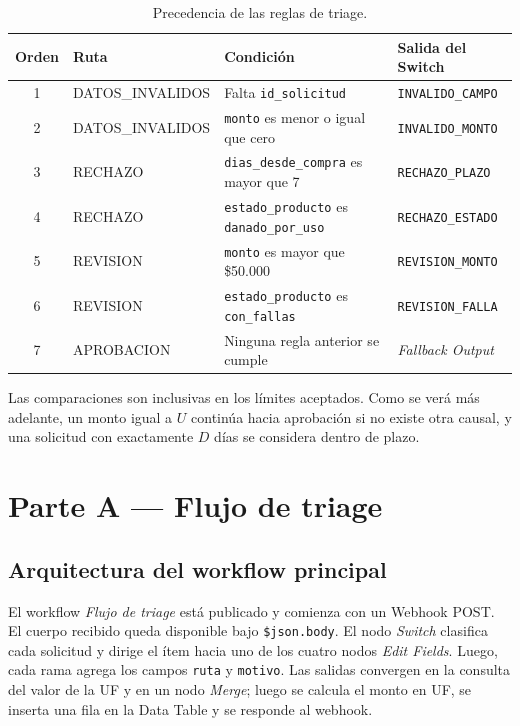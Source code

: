 \documentclass[11pt,letterpaper]{article}
\begin{document}
\begin{table}[H]
\centering
\caption{Precedencia de las reglas de triage.}
\small
\begin{tabularx}{\textwidth}{c l >{\RaggedRight\arraybackslash}X l}
\toprule
\textbf{Orden} & \textbf{Ruta} & \textbf{Condición} & \textbf{Salida del Switch} \\
\midrule
1 & DATOS\_INVALIDOS & Falta \texttt{id\_solicitud} & \texttt{INVALIDO\_CAMPO} \\
2 & DATOS\_INVALIDOS & \texttt{monto} es menor o igual que cero & \texttt{INVALIDO\_MONTO} \\
3 & RECHAZO & \texttt{dias\_desde\_compra} es mayor que 7 & \texttt{RECHAZO\_PLAZO} \\
4 & RECHAZO & \texttt{estado\_producto} es \texttt{danado\_por\_uso} & \texttt{RECHAZO\_ESTADO} \\
5 & REVISION & \texttt{monto} es mayor que \$50.000 & \texttt{REVISION\_MONTO} \\
6 & REVISION & \texttt{estado\_producto} es \texttt{con\_fallas} & \texttt{REVISION\_FALLA} \\
7 & APROBACION & Ninguna regla anterior se cumple & \textit{Fallback Output} \\
\bottomrule
\end{tabularx}
\end{table}

Las comparaciones son inclusivas en los límites aceptados. Como se verá más adelante, un monto igual a $U$ continúa hacia aprobación si no existe otra causal, y una solicitud con exactamente $D$ días se considera dentro de plazo.

\section{Parte A --- Flujo de triage}

\subsection{Arquitectura del workflow principal}
El workflow \textit{Flujo de triage} está publicado y comienza con un Webhook POST. El cuerpo recibido queda disponible bajo \texttt{\$json.body}. El nodo \textit{Switch} clasifica cada solicitud y dirige el ítem hacia uno de los cuatro nodos \textit{Edit Fields}. Luego, cada rama agrega los campos \texttt{ruta} y \texttt{motivo}. Las salidas convergen en la consulta del valor de la UF y en un nodo \textit{Merge}; luego se calcula el monto en UF, se inserta una fila en la Data Table y se responde al webhook.
\end{document}
